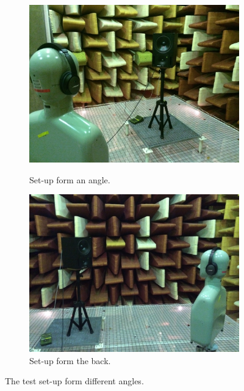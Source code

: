 \begin{figure}[H]
\begin{subfigure}[b]{0.5\textwidth}
	\end{subfigure}\qquad
	\begin{subfigure}[b]{0.4\textwidth}
		\includegraphics[width=\textwidth]{../Journal/Experiments/TestofConsumerHeadphones/Pictures/OtherBrandsSetupAngle.jpg}
		\caption{Set-up form an angle.}
		\vspace{2ex}
		\includegraphics[width=\textwidth]{../Journal/Experiments/TestofConsumerHeadphones/Pictures/OtherBrandsSetupSide.jpg}
		\caption{Set-up form the back.}
	\end{subfigure}
	\caption{The test set-up form different angles.}
\label{fig:OtherBrandsPicture}
\end{figure}


